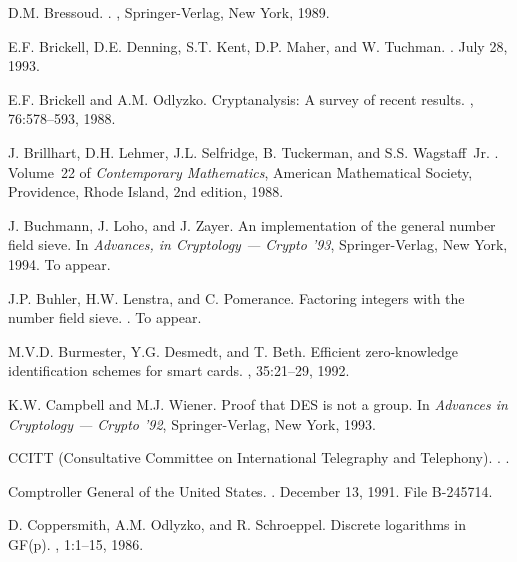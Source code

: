 \begin{thebibliography}{10}
D.M. Bressoud.
.
, Springer-Verlag, New York,
  1989.

E.F. Brickell, D.E. Denning, S.T. Kent, D.P. Maher, and W. Tuchman.
.
\newblock July 28, 1993.

E.F. Brickell and A.M. Odlyzko.
\newblock Cryptanalysis: {A} survey of recent results.
, 76:578--593, 1988.

J. Brillhart, D.H. Lehmer, J.L. Selfridge, B. Tuckerman, and S.S. Wagstaff~Jr.
.
\newblock Volume~22 of {\it Contemporary Mathematics}, American Mathematical
  Society, Providence, Rhode Island, 2nd edition, 1988.

J. Buchmann, J. Loho, and J. Zayer.
\newblock An implementation of the general number field sieve.
\newblock In {\it Advances, in Cryptology --- Crypto '93}, Springer-Verlag, New
  York, 1994.
\newblock To appear.

J.P. Buhler, H.W. Lenstra, and C. Pomerance.
\newblock Factoring integers with the number field sieve.
.
\newblock To appear.

M.V.D. Burmester, Y.G. Desmedt, and T. Beth.
\newblock Efficient zero-knowledge identification schemes for smart cards.
, 35:21--29, 1992.

K.W. Campbell and M.J. Wiener.
\newblock Proof that {DES} is not a group.
\newblock In {\it Advances in Cryptology --- Crypto '92}, Springer-Verlag, New
  York, 1993.

{CCITT (Consultative Committee on International Telegraphy and Telephony)}.
.
.

{Comptroller General of the United States}.
.
\newblock December 13, 1991.
\newblock File B-245714.

D. Coppersmith, A.M. Odlyzko, and R. Schroeppel.
\newblock Discrete logarithms in {GF(p)}.
, 1:1--15, 1986.


\end{thebibliography}
